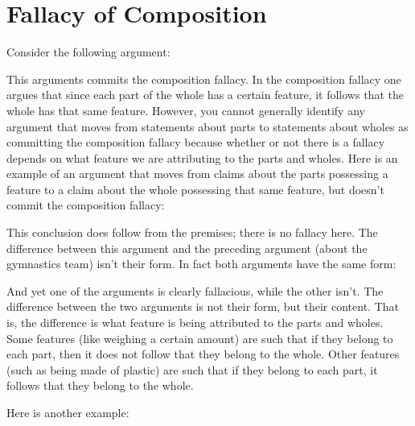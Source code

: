 \section{Fallacy of Composition}

Consider the following argument:
\begin{kormanize}
\end{kormanize}

This arguments commits the composition fallacy. In the composition fallacy one argues that since each part of the whole has a certain feature, it follows that the whole has that same feature. However, you cannot generally identify any argument that moves from statements about parts to statements about wholes as committing the composition fallacy because whether or not there is a fallacy depends on what feature we are attributing to the parts and wholes. Here is an example of an argument that moves from claims about the parts possessing a feature to a claim about the whole possessing that same feature, but doesn't commit the composition fallacy:

\begin{kormanize}
\end{kormanize}

This conclusion does follow from the premises; there is no fallacy here. The difference between this argument and the preceding argument (about the gymnastics team) isn't their form. In fact both arguments have the same form:
\begin{kormanize}
\end{kormanize}
And yet one of the arguments is clearly fallacious, while the other isn't. The difference between the two arguments is not their form, but their content. That is, the difference is what feature is being attributed to the parts and wholes. Some features (like weighing a certain amount) are such that if they belong to each part, then it does not follow that they belong to the whole. Other features (such as being made of plastic) are such that if they belong to each part, it follows that they belong to the whole.

Here is another example:

\begin{kormanize}
\end{kormanize}

